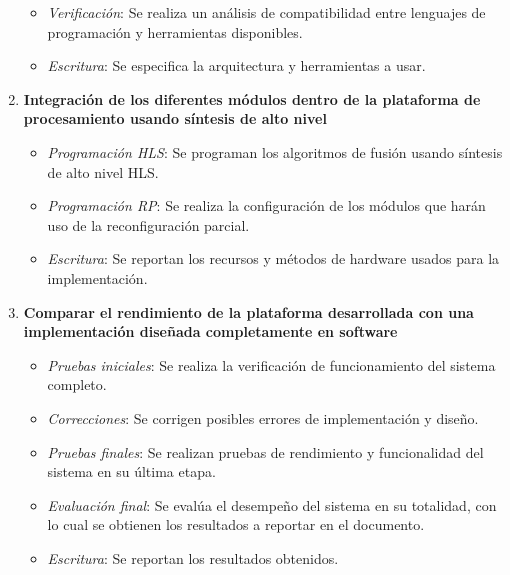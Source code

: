 \begin{enumerate}
\begin{itemize}
\item \textit{Verificación}: Se realiza un análisis de compatibilidad entre lenguajes de programación y herramientas disponibles.
\item \textit{Escritura}: Se especifica la arquitectura y herramientas a usar.
\end{itemize}
\item \textbf{Integración de los diferentes módulos dentro de la plataforma de procesamiento usando síntesis de alto nivel}
\begin{itemize}
\item \textit{Programación HLS}: Se programan los algoritmos de fusión usando síntesis de alto nivel HLS.
\item \textit{Programación RP}: Se realiza la configuración de los módulos que harán uso de la reconfiguración parcial.
\item \textit{Escritura}: Se reportan los recursos y métodos de hardware usados para la implementación.
\end{itemize}
\item \textbf{Comparar el rendimiento de la plataforma desarrollada con una implementación diseñada completamente en software}
\begin{itemize}
\item \textit{Pruebas iniciales}: Se realiza la verificación de funcionamiento del sistema completo.
\item \textit{Correcciones}: Se corrigen posibles errores de implementación y diseño.
\item \textit{Pruebas finales}: Se realizan pruebas de rendimiento y funcionalidad del sistema en su última etapa.
\item \textit{Evaluación final}: Se evalúa el desempeño del sistema en su totalidad, con lo cual se obtienen los resultados a reportar en el documento.
\item \textit{Escritura}: Se reportan los resultados obtenidos.
\end{itemize}
\end{enumerate}

  